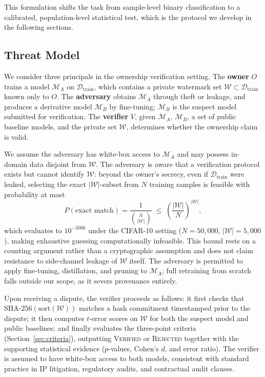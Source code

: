 \documentclass[sigconf, review, anonymous]{acmart}
\begin{document}
This formulation shifts the task from sample-level binary
classification to a calibrated, population-level statistical test,
which is the protocol we develop in the following sections.

\subsection{Threat Model}

We consider three principals in the ownership verification setting.
The \textbf{owner} $O$ trains a model $\mathcal{M}_A$ on
$\mathcal{D}_{\mathrm{train}}$, which contains a private watermark
set $\mathcal{W} \subset \mathcal{D}_{\mathrm{train}}$ known only
to $O$.
The \textbf{adversary} obtains $\mathcal{M}_A$ through theft or
leakage, and produces a derivative model $\mathcal{M}_B$ by
fine-tuning; $\mathcal{M}_B$ is the suspect model submitted for
verification.
The \textbf{verifier} $V$, given $\mathcal{M}_A$, $\mathcal{M}_B$,
a set of public baseline models, and the private set $\mathcal{W}$,
determines whether the ownership claim is valid.

We assume the adversary has white-box access to $\mathcal{M}_A$
and may possess in-domain data disjoint from $\mathcal{W}$. The
adversary is aware that a verification protocol exists but cannot
identify $\mathcal{W}$: beyond the owner's secrecy, even if
$\mathcal{D}_{\mathrm{train}}$ were leaked, selecting the exact
$|\mathcal{W}|$-subset from $N$ training samples is feasible with probability
at most
%
\begin{equation}
    P(\text{exact match})
    = \frac{1}{\binom{N}{|\mathcal{W}|}}
    \;\leq\; \left(\frac{|\mathcal{W}|}{N}\right)^{|\mathcal{W}|},
\end{equation}
%
which evaluates to $10^{-5000}$ under the CIFAR-10 setting
($N=50{,}000$, $|\mathcal{W}|=5{,}000$), making exhaustive guessing
computationally infeasible. This bound rests on a counting
argument rather than a cryptographic assumption and does not
claim resistance to side-channel leakage of $\mathcal{W}$ itself.
The adversary is permitted to apply fine-tuning, distillation,
and pruning to $\mathcal{M}_A$; full retraining from scratch
falls outside our scope, as it severs provenance entirely.

Upon receiving a dispute, the verifier proceeds as follows:
it first checks that $\mathrm{SHA\text{-}256}(\mathrm{sort}
(\mathcal{W}))$ matches a hash commitment timestamped prior to
the dispute; it then computes $t$-error scores on $\mathcal{W}$ for both the suspect model and public baselines; and finally
evaluates the three-point criteria (Section~\ref{sec:criteria}),
outputting \textsc{Verified} or \textsc{Rejected} together with
the supporting statistical evidence ($p$-values, Cohen's $d$,
and error ratio). The verifier is assumed to have white-box
access to both models, consistent with standard practice in IP
litigation, regulatory audits, and contractual audit clauses.
\end{document}
